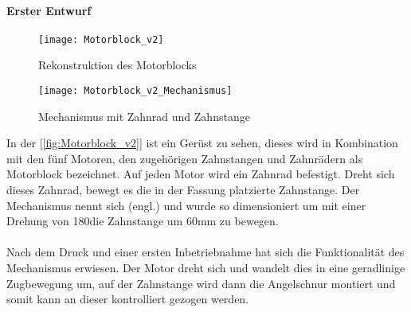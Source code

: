 \documentclass[titlepage,12pt,twoside]{article}
\begin{document}
\paragraph{Erster Entwurf}
\hfill \break
\hfill \break
\begin{figure}[H]
	\begin{center}
		\scalebox{0.8}
		{\texttt{[image: Motorblock\_v2]}}
		\caption{Rekonstruktion des Motorblocks}
		\label{fig:Motorblock_v2}			
	\end{center}
\end{figure}
\begin{figure}[H]
	\begin{center}
		\scalebox{0.8}
		{\texttt{[image: Motorblock\_v2\_Mechanismus]}}
		\caption{Mechanismus mit Zahnrad und Zahnstange}
		\label{fig:Motorblock_v22}			
	\end{center}
\end{figure}
\hfill \break
In der [\textcolor{blue}{\autoref{fig:Motorblock_v2}}] ist ein Gerüst zu sehen, dieses wird in Kombination mit den fünf Motoren, den zugehörigen Zahnstangen und Zahnrädern als Motorblock bezeichnet. Auf jeden Motor wird ein Zahnrad befestigt. Dreht sich dieses Zahnrad, bewegt es die 
in der Fassung platzierte Zahnstange. Der Mechanismus nennt sich  (engl.) und wurde so dimensioniert um mit einer Drehung von 180\textdegree die Zahnstange um 60mm zu bewegen. \\
\\
Nach dem Druck und einer ersten Inbetriebnahme hat sich die Funktionalität des Mechanismus erwiesen. Der Motor dreht sich und wandelt dies in eine geradlinige Zugbewegung um, auf der Zahnstange wird dann die Angelschnur montiert und somit kann an 
dieser kontrolliert gezogen werden. \\
\\
\end{document}
